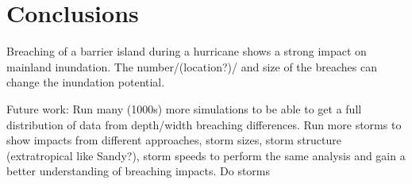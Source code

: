 \documentclass{coastal_paper}
\begin{document}
\section{Conclusions}
Breaching of a barrier island during a hurricane shows a strong impact on mainland inundation. The number/(location?)/ and size of the breaches can change the inundation potential.

Future work: Run many (1000s) more simulations to be able to get a full distribution of data from depth/width breaching differences. Run more storms to show impacts from different approaches, storm sizes, storm structure (extratropical like Sandy?), storm speeds to perform the same analysis and gain a better understanding of breaching impacts. Do storms


\end{document}
